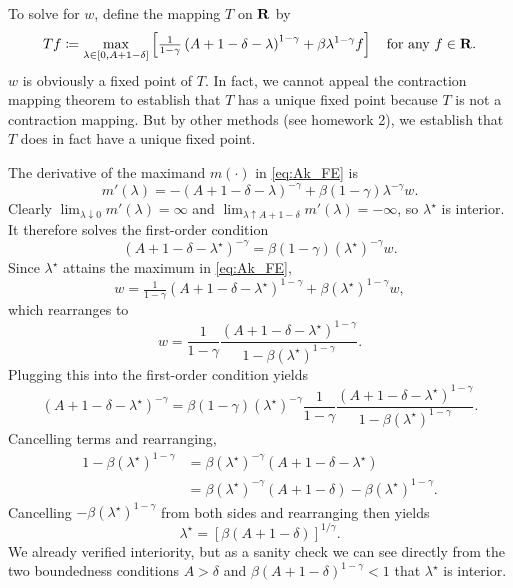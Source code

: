 \documentclass[11pt,letterpaper,reqno,oneside]{article}
\begin{document}
To solve for $w$, define the mapping $T$ on $\mathbf{R}$ by
%
\begin{equation*}
	Tf \coloneqq 
	\max_{\lambda \in [0,A+1-\delta]}
	\left[ \tfrac{1}{1-\gamma} 
	\left( A + 1 - \delta - \lambda \right)^{1-\gamma} 
	+ \beta \lambda^{1-\gamma} f
	\right] 
	\quad\text{for any $f \in \mathbf{R}$} .
\end{equation*}
%
$w$ is obviously a fixed point of $T$. In fact, we cannot appeal the contraction mapping theorem to establish that $T$ has a unique fixed point because $T$ is not a contraction mapping. But by other methods (see homework 2), we establish that $T$ does in fact have a unique fixed point.


The derivative of the maximand $m(\cdot)$ in \eqref{eq:Ak_FE} is
%
\begin{equation*}
	m'(\lambda)
	= - \left( A + 1 - \delta - \lambda \right)^{-\gamma} 
	+ \beta (1-\gamma) \lambda^{-\gamma} w .
\end{equation*}
%
Clearly $\lim_{\lambda \downarrow 0} m'(\lambda) = \infty$ and $\lim_{\lambda \uparrow A + 1 - \delta} m'(\lambda) = -\infty$, so $\lambda^\star$ is interior. It therefore solves the first-order condition
%
\begin{equation*}
	\left( A + 1 - \delta - \lambda^\star \right)^{-\gamma} 
	= \beta (1-\gamma) (\lambda^\star)^{-\gamma} w .
\end{equation*}
%
Since $\lambda^\star$ attains the maximum in \eqref{eq:Ak_FE},
%
\begin{equation*}
	w 
	= \tfrac{1}{1-\gamma} 
	\left( A + 1 - \delta - \lambda^\star \right)^{1-\gamma} 
	+ \beta (\lambda^\star)^{1-\gamma} w ,
\end{equation*}
%
which rearranges to
%
\begin{equation*}
	w
	= \frac{1}{1-\gamma} 
	\frac{ \left( A + 1 - \delta - \lambda^\star \right)^{1-\gamma} }
	{ 1 - \beta (\lambda^\star)^{1-\gamma} } .
\end{equation*}
%
Plugging this into the first-order condition yields
%
\begin{equation*}
	\left( A + 1 - \delta - \lambda^\star \right)^{-\gamma} 
	= \beta (1-\gamma) (\lambda^\star)^{-\gamma} 
	\frac{1}{1-\gamma} 
	\frac{ \left( A + 1 - \delta - \lambda^\star \right)^{1-\gamma} }
	{ 1 - \beta (\lambda^\star)^{1-\gamma} } .
\end{equation*}
%
Cancelling terms and rearranging,
%
\begin{align*}
	1 - \beta (\lambda^\star)^{1-\gamma}
	&= \beta (\lambda^\star)^{-\gamma} 
	\left( A + 1 - \delta - \lambda^\star \right) 
	\\
	&= \beta (\lambda^\star)^{-\gamma} 
	\left( A + 1 - \delta \right)  - \beta (\lambda^\star)^{1-\gamma} .
\end{align*}
%
Cancelling $-\beta (\lambda^\star)^{1-\gamma}$ from both sides and rearranging then yields
%
\begin{equation*}
	\lambda^\star
	= \left[ \beta \left( A + 1 - \delta \right) \right]^{1/\gamma} . 
\end{equation*}
%
We already verified interiority, but as a sanity check we can see directly from the two boundedness conditions $A > \delta$ and $\beta (A+1-\delta)^{1-\gamma} < 1$ that $\lambda^\star$ is interior.
\end{document}
